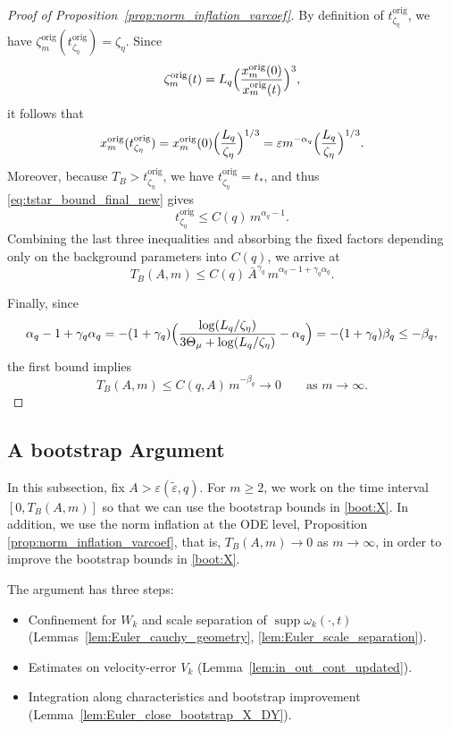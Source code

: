 \documentclass[reqno,11pt]{amsart}
\newcommand{\supp}{\operatorname{supp}}
\begin{document}
\begin{proof}[Proof of Proposition~\ref{prop:norm_inflation_varcoef}]
By definition of $t_{\zeta_\eta}^{\mathrm{orig}}$, we have $\zeta_m^{\mathrm{orig}}(t_{\zeta_\eta}^{\mathrm{orig}})=\zeta_\eta$. Since
\[
\zeta_m^{\mathrm{orig}}(t)=L_q\Bigl(\frac{x_m^{\mathrm{orig}}(0)}{x_m^{\mathrm{orig}}(t)}\Bigr)^3,
\]
it follows that
\[
x_m^{\mathrm{orig}}(t_{\zeta_\eta}^{\mathrm{orig}})
=
x_m^{\mathrm{orig}}(0)\Bigl(\frac{L_q}{\zeta_\eta}\Bigr)^{1/3}
=
\varepsilon m^{-\alpha_q}\Bigl(\frac{L_q}{\zeta_\eta}\Bigr)^{1/3}.
\]
Moreover, because $T_B>t_{\zeta_\eta}^{\mathrm{orig}}$, we have $t_{\zeta_\eta}^{\mathrm{orig}}=t_*$, and thus
\eqref{eq:tstar_bound_final_new} gives
\[
t_{\zeta_\eta}^{\mathrm{orig}}\le C(q)\,m^{\alpha_q-1}.
\]
Combining the last three inequalities and absorbing the fixed factors depending only on the
background parameters into $C(q)$, we arrive at
\[
T_B(A,m)\le C(q)\,\bar A^{\gamma_q}\,m^{\alpha_q-1+\gamma_q\alpha_q}.
\]

Finally, since
\[
\alpha_q-1+\gamma_q\alpha_q
=-(1+\gamma_q)\Bigl(\frac{\log(L_q/\zeta_\eta)}{3\Theta_\mu+\log(L_q/\zeta_\eta)}-\alpha_q\Bigr)
=-(1+\gamma_q)\beta_q \le -\beta_q,
\]
the first bound implies
\[
T_B(A,m)\le C(q,A)\,m^{-\beta_q}\to 0
\qquad\text{as }m\to\infty.
\]
\end{proof}


\subsection{A bootstrap Argument}\label{subsec:Euler_bootstrap_improvement}

In this subsection, fix $A>\varepsilon(\tilde \varepsilon,q)$. 
For $m\geq2$, we work on the time interval $[0,T_B(A,m)]$ so that we can use the bootstrap bounds in \eqref{boot:X}. In addition, we use the norm inflation at the ODE level, Proposition \ref{prop:norm_inflation_varcoef}, that is, $T_B(A,m)\to 0$ as $m\to\infty$, in order to improve the bootstrap bounds in \eqref{boot:X}.


The argument has three steps:
\begin{itemize}
\item[(1)] Confinement for $W_k$ and scale separation  of  $\supp \omega_k(\cdot, t)$ (Lemmas~\ref{lem:Euler_cauchy_geometry}, \ref{lem:Euler_scale_separation}).
\item[(2)] Estimates on velocity-error $V_k$ (Lemma~\ref{lem:in_out_cont_updated}).
\item[(3)] Integration along characteristics and bootstrap improvement (Lemma~\ref{lem:Euler_close_bootstrap_X_DY}).
\end{itemize}
\end{document}
